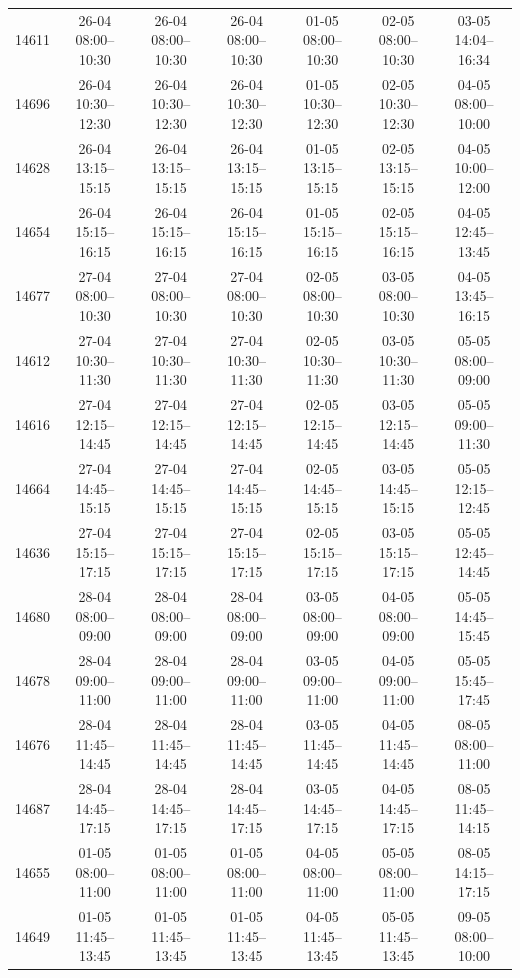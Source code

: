 \begin{table}[htbp]
\begin{tabular}{|r|c|c|c|c|c|c|}
14611 & 26-04 08:00--10:30 & 26-04 08:00--10:30 & 26-04 08:00--10:30 & 01-05 08:00--10:30 & 02-05 08:00--10:30 & 03-05 14:04--16:34 \\ 
14696 & 26-04 10:30--12:30 & 26-04 10:30--12:30 & 26-04 10:30--12:30 & 01-05 10:30--12:30 & 02-05 10:30--12:30 & 04-05 08:00--10:00 \\ 
14628 & 26-04 13:15--15:15 & 26-04 13:15--15:15 & 26-04 13:15--15:15 & 01-05 13:15--15:15 & 02-05 13:15--15:15 & 04-05 10:00--12:00 \\ 
14654 & 26-04 15:15--16:15 & 26-04 15:15--16:15 & 26-04 15:15--16:15 & 01-05 15:15--16:15 & 02-05 15:15--16:15 & 04-05 12:45--13:45 \\ 
14677 & 27-04 08:00--10:30 & 27-04 08:00--10:30 & 27-04 08:00--10:30 & 02-05 08:00--10:30 & 03-05 08:00--10:30 & 04-05 13:45--16:15 \\ 
14612 & 27-04 10:30--11:30 & 27-04 10:30--11:30 & 27-04 10:30--11:30 & 02-05 10:30--11:30 & 03-05 10:30--11:30 & 05-05 08:00--09:00 \\ 
14616 & 27-04 12:15--14:45 & 27-04 12:15--14:45 & 27-04 12:15--14:45 & 02-05 12:15--14:45 & 03-05 12:15--14:45 & 05-05 09:00--11:30 \\ 
14664 & 27-04 14:45--15:15 & 27-04 14:45--15:15 & 27-04 14:45--15:15 & 02-05 14:45--15:15 & 03-05 14:45--15:15 & 05-05 12:15--12:45 \\ 
14636 & 27-04 15:15--17:15 & 27-04 15:15--17:15 & 27-04 15:15--17:15 & 02-05 15:15--17:15 & 03-05 15:15--17:15 & 05-05 12:45--14:45 \\ 
14680 & 28-04 08:00--09:00 & 28-04 08:00--09:00 & 28-04 08:00--09:00 & 03-05 08:00--09:00 & 04-05 08:00--09:00 & 05-05 14:45--15:45 \\ 
14678 & 28-04 09:00--11:00 & 28-04 09:00--11:00 & 28-04 09:00--11:00 & 03-05 09:00--11:00 & 04-05 09:00--11:00 & 05-05 15:45--17:45 \\ 
14676 & 28-04 11:45--14:45 & 28-04 11:45--14:45 & 28-04 11:45--14:45 & 03-05 11:45--14:45 & 04-05 11:45--14:45 & 08-05 08:00--11:00 \\ 
14687 & 28-04 14:45--17:15 & 28-04 14:45--17:15 & 28-04 14:45--17:15 & 03-05 14:45--17:15 & 04-05 14:45--17:15 & 08-05 11:45--14:15 \\ 
14655 & 01-05 08:00--11:00 & 01-05 08:00--11:00 & 01-05 08:00--11:00 & 04-05 08:00--11:00 & 05-05 08:00--11:00 & 08-05 14:15--17:15 \\ 
14649 & 01-05 11:45--13:45 & 01-05 11:45--13:45 & 01-05 11:45--13:45 & 04-05 11:45--13:45 & 05-05 11:45--13:45 & 09-05 08:00--10:00 \\ 

\end{tabular}
\end{table}
